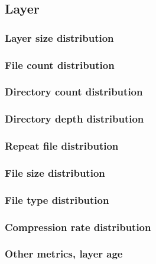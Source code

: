 \subsection{Layer}

\subsubsection{Layer size distribution}

\subsubsection{File count distribution}

\subsubsection{Directory count distribution}

\subsubsection{Directory depth distribution}

\subsubsection{Repeat file distribution}

\subsubsection{File size distribution}

\subsubsection{File type distribution}

\subsubsection{Compression rate distribution}

\subsubsection{Other metrics, layer age}

